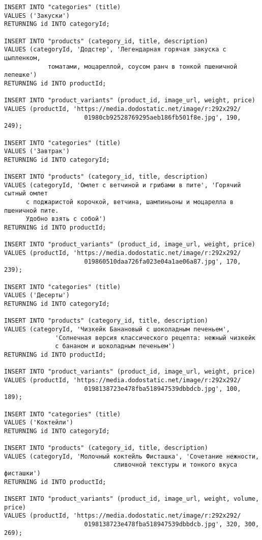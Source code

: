 \documentclass[a4paper,14pt]{extarticle}
\begin{document}
\begin{Verbatim}[tabsize=4,fontsize=\small]
INSERT INTO "categories" (title)
VALUES ('Закуски')
RETURNING id INTO categoryId;

INSERT INTO "products" (category_id, title, description)
VALUES (categoryId, 'Додстер', 'Легендарная горячая закуска с цыпленком, 
            томатами, моцареллой, соусом ранч в тонкой пшеничной лепешке')
RETURNING id INTO productId;

INSERT INTO "product_variants" (product_id, image_url, weight, price)
VALUES (productId, 'https://media.dodostatic.net/image/r:292x292/
                      01980cb92528769295aeb186fb501f8e.jpg', 190, 249);

INSERT INTO "categories" (title)
VALUES ('Завтрак')
RETURNING id INTO categoryId;

INSERT INTO "products" (category_id, title, description)
VALUES (categoryId, 'Омлет с ветчиной и грибами в пите', 'Горячий сытный омлет 
      с поджаристой корочкой, ветчина, шампиньоны и моцарелла в пшеничной пите. 
      Удобно взять с собой')
RETURNING id INTO productId;

INSERT INTO "product_variants" (product_id, image_url, weight, price)
VALUES (productId, 'https://media.dodostatic.net/image/r:292x292/
                      019860510daa726fa023e04a1ae06a87.jpg', 170, 239);

INSERT INTO "categories" (title)
VALUES ('Десерты')
RETURNING id INTO categoryId;

INSERT INTO "products" (category_id, title, description)
VALUES (categoryId, 'Чизкейк Банановый с шоколадным печеньем', 
              'Солнечная версия классического рецепта: нежный чизкейк 
              с бананом и шоколадным печеньем')
RETURNING id INTO productId;

INSERT INTO "product_variants" (product_id, image_url, weight, price)
VALUES (productId, 'https://media.dodostatic.net/image/r:292x292/
                      0198138723e478fba518947539dbbdcb.jpg', 100, 189);

INSERT INTO "categories" (title)
VALUES ('Коктейли')
RETURNING id INTO categoryId;

INSERT INTO "products" (category_id, title, description)
VALUES (categoryId, 'Молочный коктейль Фисташка', 'Сочетание нежности, 
                              сливочной текстуры и тонкого вкуса фисташки')
RETURNING id INTO productId;

INSERT INTO "product_variants" (product_id, image_url, weight, volume, price)
VALUES (productId, 'https://media.dodostatic.net/image/r:292x292/
                      0198138723e478fba518947539dbbdcb.jpg', 320, 300, 269);


\end{Verbatim}
\end{document}
